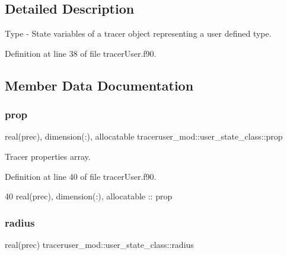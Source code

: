 \subsection{Detailed Description}
Type -\/ State variables of a tracer object representing a user defined type. 

Definition at line 38 of file tracer\+User.\+f90.



\subsection{Member Data Documentation}
\mbox{\label{structtraceruser__mod_1_1user__state__class_a803743e4e70a29b15fd27b20b017f402}} 
\subsubsection{\texorpdfstring{prop}{prop}}
{\footnotesize\ttfamily real(prec), dimension(\+:), allocatable traceruser\+\_\+mod\+::user\+\_\+state\+\_\+class\+::prop\hspace{0.3cm}{\ttfamily [private]}}



Tracer properties array. 



Definition at line 40 of file tracer\+User.\+f90.


\begin{DoxyCode}
40         \textcolor{keywordtype}{real(prec)}, \textcolor{keywordtype}{dimension(:)}, \textcolor{keywordtype}{allocatable} :: prop
\end{DoxyCode}
\mbox{\label{structtraceruser__mod_1_1user__state__class_a3d7a35c3da2c73261d03de9bb9914c07}} 
\subsubsection{\texorpdfstring{radius}{radius}}
{\footnotesize\ttfamily real(prec) traceruser\+\_\+mod\+::user\+\_\+state\+\_\+class\+::radius\hspace{0.3cm}{\ttfamily [private]}}



